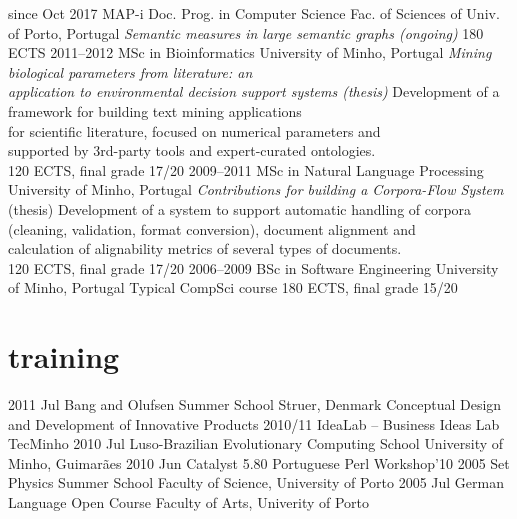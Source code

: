\documentclass[a4paper]{friggeri-cv}
\begin{document}
\begin{entrylist}
  \entry
    {{\tiny since} Oct 2017}
    {MAP-i Doc. Prog. in Computer Science}
    {Fac. of Sciences of Univ. of Porto, Portugal}
    {\emph{Semantic measures in large semantic graphs (ongoing)}}
    {180 ECTS}
  \entry
    {2011--2012}
    {MSc in Bioinformatics}
    {University of Minho, Portugal}
    {\emph{Mining biological parameters from literature: an\\
    application to environmental decision support systems (thesis)}}
    {Development of a framework
    for building text mining applications\\
    for scientific literature, focused on numerical parameters and\\
    supported by 3rd-party tools and expert-curated
    ontologies.\\
    120 ECTS, final grade 17/20
    }
  \entry
    {2009--2011}
    {MSc in Natural Language Processing}
    {University of Minho, Portugal}
    {\emph{Contributions for building a Corpora-Flow System} (thesis)}
    {\footnotesize{Development of a system to support automatic handling of corpora\\
    (cleaning, validation, format conversion), document alignment and\\
    calculation of alignability metrics of several types of documents.}\\
    120 ECTS, final grade 17/20
    }
  \entry
    {2006--2009}
    {BSc in Software Engineering}
    {University of Minho, Portugal}
    {Typical CompSci course}
    {180 ECTS, final grade 15/20}
\end{entrylist}


\section{training}
\begin{entrylist}
    \entry
        {2011 {\footnotesize Jul}}
        {Bang and Olufsen Summer School}
        {Struer, Denmark}
        {Conceptual Design and Development of Innovative Products}
        {\vspace{-0.4cm}}
    \entry
        {2010/11}
        {IdeaLab -- Business Ideas Lab}
        {TecMinho}
        {}
        {\vspace{-0.8cm}}
    \entry
        {2010 {\footnotesize Jul}}
        {Luso-Brazilian Evolutionary Computing School}
        {University of Minho, Guimarães}
        {}
        {\vspace{-0.8cm}}
    \entry
        {2010 {\footnotesize Jun}}
        {Catalyst 5.80}
        {Portuguese Perl Workshop'10}
        {\vspace{-0.8cm}}
        {}
    \entry
        {2005 {\footnotesize Set}}
        {Physics Summer School}
        {Faculty of Science, University of Porto}
        {\vspace{-0.8cm}}
        {}
    \entry
        {2005 {\footnotesize Jul}}
        {German Language Open Course}
        {Faculty of Arts, Univerity of Porto}
        {\vspace{-0.8cm}}
        {}
\end{entrylist}
\end{document}
